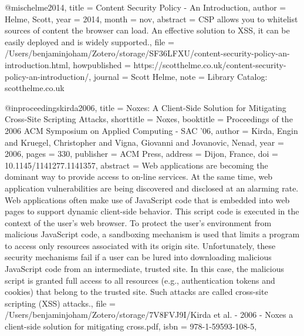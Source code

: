 @misc{helme2014,
  title = {Content {{Security Policy}} - {{An Introduction}}},
  author = {Helme, Scott},
  year = {2014},
  month = nov,
  abstract = {CSP allows you to whitelist sources of content the browser can load. An effective solution to XSS, it can be easily deployed and is widely supported.},
  file = {/Users/benjaminjoham/Zotero/storage/SF36LFXU/content-security-policy-an-introduction.html},
  howpublished = {https://scotthelme.co.uk/content-security-policy-an-introduction/},
  journal = {Scott Helme},
  note = {Library Catalog: scotthelme.co.uk}
}

@inproceedings{kirda2006,
  title = {Noxes: A Client-Side Solution for Mitigating Cross-Site Scripting Attacks},
  shorttitle = {Noxes},
  booktitle = {Proceedings of the 2006 {{ACM}} Symposium on {{Applied}} Computing  - {{SAC}} '06},
  author = {Kirda, Engin and Kruegel, Christopher and Vigna, Giovanni and Jovanovic, Nenad},
  year = {2006},
  pages = {330},
  publisher = {{ACM Press}},
  address = {{Dijon, France}},
  doi = {10.1145/1141277.1141357},
  abstract = {Web applications are becoming the dominant way to provide access to on-line services. At the same time, web application vulnerabilities are being discovered and disclosed at an alarming rate. Web applications often make use of JavaScript code that is embedded into web pages to support dynamic client-side behavior. This script code is executed in the context of the user's web browser. To protect the user's environment from malicious JavaScript code, a sandboxing mechanism is used that limits a program to access only resources associated with its origin site. Unfortunately, these security mechanisms fail if a user can be lured into downloading malicious JavaScript code from an intermediate, trusted site. In this case, the malicious script is granted full access to all resources (e.g., authentication tokens and cookies) that belong to the trusted site. Such attacks are called cross-site scripting (XSS) attacks.},
  file = {/Users/benjaminjoham/Zotero/storage/7V8FVJ9I/Kirda et al. - 2006 - Noxes a client-side solution for mitigating cross.pdf},
  isbn = {978-1-59593-108-5},
}

